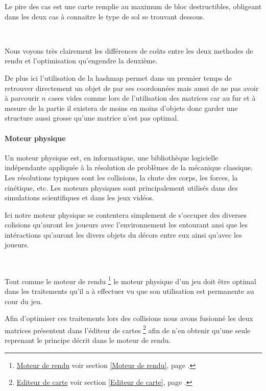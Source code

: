 			Le pire des cas est une carte remplie au maximum de bloc destructibles,
			obligeant dans les deux cas à connaitre le type de sol se trouvant dessous.
			
			$\,$
			
			Nous voyons très clairement les différences de coûts entre les deux methodes
			de rendu et l'optimisation qu'engendre la deuxième.
			
			De plus ici l'utilisation de la hashmap permet dans un premier temps de
			retrouver directement un objet de par ses coordonnées mais aussi de ne pas
			avoir à parcourir $n$ cases vides comme lors de l'utilisation des matrices
			car au fur et à mesure de la partie il existera de moins en moins d'objets
			donc garder une structure aussi grosse qu'une matrice n'est pas optimal.
		
		\paragraph{Moteur physique\\}
		
			\hypertarget{Moteur physique}{}
			\label{Moteur physique}
			
			Un moteur physique est, en informatique, une bibliothèque logicielle 
			indépendante appliquée à la résolution de problèmes de la mécanique
			classique.  Les résolutions typiques sont les collisions, la chute des corps,
			les forces, la cinétique, etc.
			Les moteurs physiques sont principalement utilisés dans des simulations 
			scientifiques et dans les jeux vidéos.
			
			
			Ici notre moteur physique se contentera simplement de s'occuper des diverses
			colisions qu'auront les joueurs avec l'environnement les entourant ansi que
			les intéractions qu'auront les divers objets du décors entre eux ainsi qu'avec les joueurs.

			$\,$		
			
			Tout comme le moteur de rendu
			\footnote{
				\hyperlink{Moteur de rendu}{Moteur de rendu}
				\og voir section \ref{Moteur de rendu}, page \pageref{Moteur de rendu}.\fg
			}
			le moteur physique d'un jeu doit être optimal dans les traitements qu'il a à
			effectuer vu que son utilisation est permanente au cour du jeu.
			
			
			Afin d'optimiser ces traitements lors des collisions nous avons fusionné les
			deux matrices présentent dans l'éditeur de cartes
			\footnote{
				\hyperlink{Editeur de carte}{Editeur de carte}
				\og voir section \ref{Editeur de carte}, page \pageref{Editeur de carte}.\fg
			}
			afin de n'en obtenir qu'une seule reprenant le principe décrit dans le moteur
			de rendu\footnotemark[2].
			

